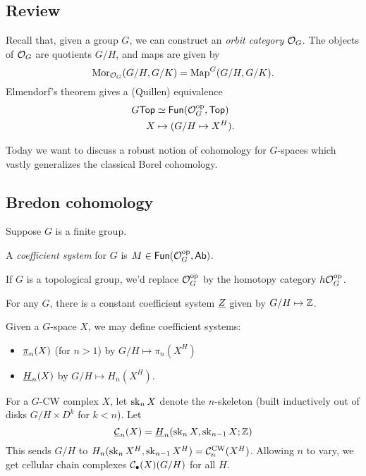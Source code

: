 \documentclass{article}
\begin{document}
\subsection{Review}

Recall that, given a group $G$, we can construct an \emph{orbit category} $\mathcal{O}_G$.
The objects of $\mathcal{O}_G$ are quotients $G / H$, and maps are given by
\[
  \operatorname{Mor}_{\mathcal{O}_G}(G/H, G/K) = \operatorname{Map}^G(G/H, G/K).
\]
Elmendorf's theorem gives a (Quillen) equivalence
\begin{align*}
  G\mathsf{Top} &\simeq \mathsf{Fun}(\mathcal{O}_G^{\mathrm{op}}, \mathsf{Top}) \\
  X &\mapsto (G/H \mapsto X^H).
\end{align*}

Today we want to discuss a robust notion of cohomology for $G$-spaces which vastly generalizes the classical Borel cohomology.

\subsection{Bredon cohomology}

Suppose $G$ is a finite group.

\begin{dfn}
  A \emph{coefficient system} for $G$ is $M \in \mathsf{Fun}(\mathcal{O}_G^{\mathrm{op}}, \mathsf{Ab})$.
\end{dfn}

\begin{rmk}
  If $G$ is a topological group, we'd replace $\mathcal{O}_G^{\mathrm{op}}$ by the homotopy category $h\mathcal{O}_G^{\mathrm{op}}$.
\end{rmk}

\begin{ex}
  For any $G$, there is a constant coefficient system $\underline{Z}$ given by $G/H \mapsto \mathbb{Z}$.
\end{ex}

\begin{ex}
  Given a $G$-space $X$, we may define coefficient systems:
  \begin{itemize}
    \item $\underline{\pi}_n(X)$ (for $n > 1$) by $G/H \mapsto \pi_n(X^H)$
    \item $\underline{H}_n(X)$ by $G/H \mapsto H_n(X^H)$.
  \end{itemize}
\end{ex}

For a $G$-CW complex $X$, let $\operatorname{sk}_n X$ denote the $n$-skeleton (built inductively out of disks $G / H \times D^k$ for $k < n$).
Let
\[
  \underline{\mathcal{C}}_n(X) = \underline{H}_n(\operatorname{sk}_n X, \operatorname{sk}_{n-1} X; \mathbb{Z})
\]
This sends $G/H$ to $H_n(\operatorname{sk}_n X^H, \operatorname{sk}_{n-1} X^H) = \mathcal{C}_n^{\mathrm{CW}}(X^H)$.
Allowing $n$ to vary, we get cellular chain complexes $\mathcal{C}_\bullet(X)(G/H)$ for all $H$.
\end{document}

